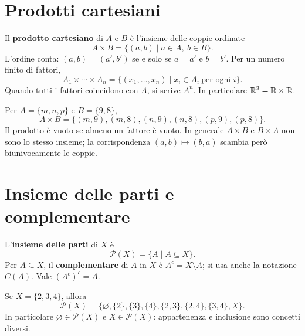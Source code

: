 \section{Prodotti cartesiani}
\begin{definizione}
Il \textbf{prodotto cartesiano} di $A$ e $B$ è l'insieme delle coppie ordinate
\[
A\times B=\{(a,b)\mid a\in A,\ b\in B\}.
\]
L'ordine conta: $(a,b)=(a',b')$ se e solo se $a=a'$ e $b=b'$. Per un numero finito di fattori,
\[
A_1\times\cdots\times A_n=\{(x_1,\ldots,x_n)\mid x_i\in A_i\ \text{per ogni }i\}.
\]
Quando tutti i fattori coincidono con $A$, si scrive $A^n$. In particolare $\mathbb{R}^2=\mathbb{R}\times\mathbb{R}$.
\end{definizione}

\begin{esempio}
Per $A=\{m,n,p\}$ e $B=\{9,8\}$,
\[
A\times B=\{(m,9),(m,8),(n,9),(n,8),(p,9),(p,8)\}.
\]
Il prodotto è vuoto se almeno un fattore è vuoto. In generale $A\times B$ e $B\times A$ non sono lo stesso insieme; la corrispondenza $(a,b)\mapsto(b,a)$ scambia però biunivocamente le coppie.
\end{esempio}

\section{Insieme delle parti e complementare}
\begin{definizione}
L'\textbf{insieme delle parti} di $X$ è
\[
\mathcal P(X)=\{A\mid A\subseteq X\}.
\]
Per $A\subseteq X$, il \textbf{complementare} di $A$ in $X$ è $A^c=X\setminus A$; si usa anche la notazione $C(A)$. Vale $(A^c)^c=A$.
\end{definizione}

\begin{schema}
\end{schema}

\begin{esempio}
Se $X=\{2,3,4\}$, allora
\[
\mathcal P(X)=\{\varnothing,\{2\},\{3\},\{4\},\{2,3\},\{2,4\},\{3,4\},X\}.
\]
In particolare $\varnothing\in\mathcal P(X)$ e $X\in\mathcal P(X)$: appartenenza e inclusione sono concetti diversi.
\end{esempio}


